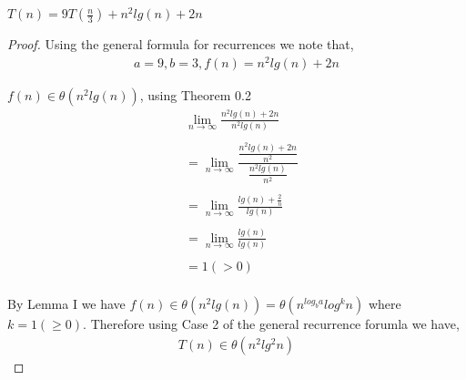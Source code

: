 \documentclass[12pt]{article}
\newenvironment{lemma}[2][Lemma]{\begin{trivlist}
\item[\hskip \labelsep {\bfseries #1}\hskip \labelsep {\bfseries #2.}]}{\end{trivlist}}
\newenvironment{question}[2][Question]{\begin{trivlist}
\item[\hskip \labelsep {\bfseries #1}\hskip \labelsep {\bfseries #2.}]}{\end{trivlist}}
\begin{document}
\begin{question}{5 (a)} $T(n) = 9T(\frac{n}{3}) + n^{2}lg(n) + 2n$
  \leavevmode \\
  \begin{proof}
  Using the general formula for recurrences we note that,
  \begin{align*}
    a = 9, b = 3, f(n) = n^{2}lg(n) + 2n
  \end{align*}

    \begin{lemma}{I} $f(n) \in \theta(n^{2}lg(n))$, using Theorem 0.2
      \begin{align*}
        &\lim_{n\to\infty} \frac{
        n^{2}lg(n) + 2n
      }{
        n^{2}lg(n)
      }\\ \\
      & = \lim_{n\to\infty} \frac{
        \dfrac{
          n^{2}lg(n) + 2n
        }{n^{2}}
      }{
        \dfrac{
          n^{2}lg(n)
        }{n^{2}}
      }\\ \\
      & = \lim_{n\to\infty} \frac{
        lg(n) + \frac{2}{n}
      }{
        lg(n)
      }\\ \\
      & = \lim_{n\to\infty} \frac{
        lg(n)
      }{
        lg(n)
      }\\ \\
      & = 1 (> 0)\\
      \end{align*}
    \end{lemma}

    By Lemma I we have $f(n) \in \theta(n^{2}lg(n)) = \theta(n^{log_{b}a}log^{k}n)$ where $k = 1 (\geq 0)$.
    Therefore using Case 2 of the general recurrence forumla we have,
    \begin{align*}
      T(n) \in \theta(n^{2}lg^{2}n)
    \end{align*}
  \end{proof}
\end{question}
\end{document}
